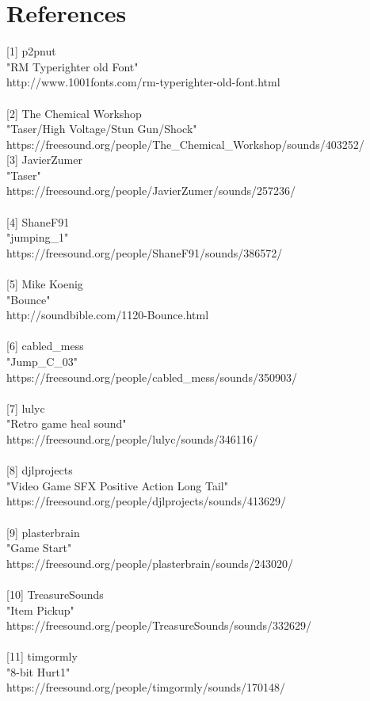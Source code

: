 \documentclass[10pt, a4paper]{article}
\begin{document}
\section {References}
{[1]} p2pnut\\
"RM Typerighter old Font"\\
http://www.1001fonts.com/rm-typerighter-old-font.html\\
\\
{[2]} The Chemical Workshop \\
"Taser/High Voltage/Stun Gun/Shock"\\
https://freesound.org/people/The\_Chemical\_Workshop/sounds/403252/
\\
{[3]} JavierZumer\\
"Taser"\\
https://freesound.org/people/JavierZumer/sounds/257236/\\
\\
{[4]} ShaneF91\\
"jumping\_1"\\
https://freesound.org/people/ShaneF91/sounds/386572/\\
\\
{[5]} Mike Koenig\\
"Bounce"\\
http://soundbible.com/1120-Bounce.html\\
\\
{[6]} cabled\_mess\\
"Jump\_C\_03"\\
https://freesound.org/people/cabled\_mess/sounds/350903/\\
\\
{[7]} lulyc\\
"Retro game heal sound"\\
https://freesound.org/people/lulyc/sounds/346116/\\
\\
{[8]} djlprojects\\
"Video Game SFX Positive Action Long Tail"\\
https://freesound.org/people/djlprojects/sounds/413629/\\
\\
{[9]} plasterbrain\\
"Game Start"\\
https://freesound.org/people/plasterbrain/sounds/243020/\\
\\
{[10]} TreasureSounds\\
"Item Pickup"\\
https://freesound.org/people/TreasureSounds/sounds/332629/\\
\\
{[11]} timgormly\\
"8-bit Hurt1"\\
https://freesound.org/people/timgormly/sounds/170148/\\


		
\end{document}
